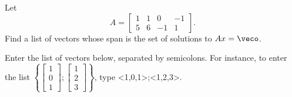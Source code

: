 Let  \[A = \left[ \begin{array}{cccc} 1 & 1 & 0 & -1\\ 
5 & 6 & -1 & 1 \end{array} \right].\]  Find a list
of vectors whose span is the set of solutions to $Ax = \veco$.  

Enter the list of vectors below, separated by semicolons.  For instance, 
to enter the list $\left\{\left[\begin{array}{c} 1 \\ 0 \\ 1
\end{array} \right]; \left[\begin{array}{c} 1 \\ 2 \\ 3
\end{array} \right] \right\}$, type <1,0,1>;<1,2,3>.  



